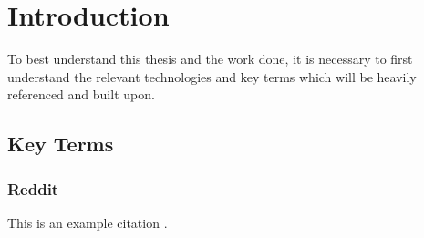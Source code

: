 \documentclass[msc,oneside]{ubcthesis}%
\begin{document}

\mainmatter


\chapter{Introduction}
To best understand this thesis and the work done, it is necessary to first understand the relevant technologies and key terms which will be heavily referenced and built upon. 

\section{Key Terms}

\subsection{Reddit}
This is an example citation \cite{varineq}.

\newpage %
\pagestyle{fancy}\rhead{}\cfoot{}\rfoot{\thepage}

%
\end{document}
